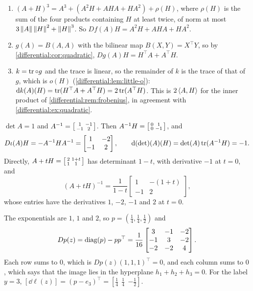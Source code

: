 \begin{enumerate}[nosep]
  \item $(A + H)^3 = A^3 + (A^2H + AHA + HA^2) + \rho(H)$, where
        $\rho(H)$ is the sum of the four products containing $H$ at least
        twice, of norm at most $3\left\|A\right\|\left\|H\right\|^2 + \left\|H\right\|^3$. So
        $Df(A)H = A^2H + AHA + HA^2$.
  \item $g(A) = B(A, A)$ with the bilinear map $B(X, Y) = X^\top Y$, so by
        \cref{differential:cor:quadratic},
        $Dg(A)H = H^\top A + A^\top H$.
  \item $k = \operatorname{tr}\circ g$ and the trace is linear, so the remainder of
        $k$ is the trace of that of $g$, which is $o(H)$
        (\cref{differential:lem:little-o}):
        $\mathrm{d} k(A)(H) = \operatorname{tr}(H^\top A + A^\top H) = 2\operatorname{tr}(A^\top H)$. This is
        $2\left\langle A, H \right\rangle$ for the inner product of
        \cref{differential:rem:frobenius}, in agreement with
        \cref{differential:ex:quadratic}.
\end{enumerate}

$\det A = 1$ and $A^{-1} = \begin{bsmallmatrix}1 & -1\\-1 & 2
\end{bsmallmatrix}$. Then
$A^{-1}H = \begin{bsmallmatrix}0 & 1\\0 & -1\end{bsmallmatrix}$, and
\[
  D\iota(A)H = -A^{-1}HA^{-1}
  = \begin{bmatrix}1 & -2\\-1 & 2\end{bmatrix},
  \qquad
  \mathrm{d}(\det)(A)(H) = \det(A)\operatorname{tr}(A^{-1}H) = -1 .
\]
Directly, $A + tH = \begin{bsmallmatrix}2 & 1 + t\\1 & 1
\end{bsmallmatrix}$ has determinant $1 - t$, with derivative $-1$ at
$t = 0$, and
\[
  (A + tH)^{-1} = \frac1{1 - t}
  \begin{bmatrix}1 & -(1 + t)\\-1 & 2\end{bmatrix} ,
\]
whose entries have the derivatives $1$, $-2$, $-1$ and $2$ at $t = 0$.

The exponentials are $1$, $1$ and $2$, so
$p = (\frac14, \frac14, \frac12)$ and
\[
  Dp(z) = \operatorname{diag}(p) - pp^\top
  = \frac1{16}\begin{bmatrix}3 & -1 & -2\\-1 & 3 & -2\\-2 & -2 & 4
  \end{bmatrix} .
\]
Each row sums to $0$, which is $Dp(z)(1, 1, 1)^\top = 0$, and each
column sums to $0$, which says that the image lies in the hyperplane
$h_1 + h_2 + h_3 = 0$. For the label $y = 3$,
$[\dd\ell(z)] = (p - e_3)^\top = [\frac14\ \ \frac14\ \ {-\frac12}]$.

